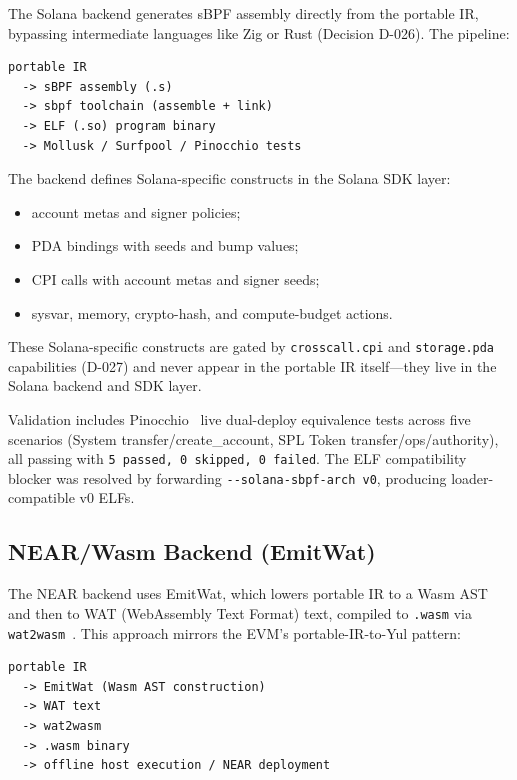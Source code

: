 \documentclass[sigconf]{acmart}
\begin{document}
The Solana backend generates sBPF assembly directly from the portable IR, bypassing
intermediate languages like Zig or Rust (Decision D-026). The pipeline:

\begin{lstlisting}[style=textcode]
portable IR
  -> sBPF assembly (.s)
  -> sbpf toolchain (assemble + link)
  -> ELF (.so) program binary
  -> Mollusk / Surfpool / Pinocchio tests
\end{lstlisting}

The backend defines Solana-specific constructs in the Solana SDK layer:
\begin{itemize}[leftmargin=*,nosep]
  \item account metas and signer policies;
  \item PDA bindings with seeds and bump values;
  \item CPI calls with account metas and signer seeds;
  \item sysvar, memory, crypto-hash, and compute-budget actions.
\end{itemize}

These Solana-specific constructs are gated by \texttt{crosscall.cpi} and \texttt{storage.pda}
capabilities (D-027) and never appear in the portable IR itself---they live in the Solana
backend and SDK layer.

Validation includes Pinocchio~\cite{pinocchio} live dual-deploy equivalence tests across five
scenarios (System transfer/create\_account, SPL Token transfer/ops/authority), all passing with
\texttt{5 passed, 0 skipped, 0 failed}. The ELF compatibility blocker was resolved by forwarding
\texttt{-{}-solana-sbpf-arch~v0}, producing loader-compatible v0 ELFs.

\subsection{NEAR/Wasm Backend (EmitWat)}

The NEAR backend uses EmitWat, which lowers portable IR to a Wasm AST and then to WAT
(WebAssembly Text Format) text, compiled to \texttt{.wasm} via \texttt{wat2wasm}~\cite{wasm}.
This approach mirrors the EVM's portable-IR-to-Yul pattern:

\begin{lstlisting}[style=textcode]
portable IR
  -> EmitWat (Wasm AST construction)
  -> WAT text
  -> wat2wasm
  -> .wasm binary
  -> offline host execution / NEAR deployment
\end{lstlisting}
\end{document}

